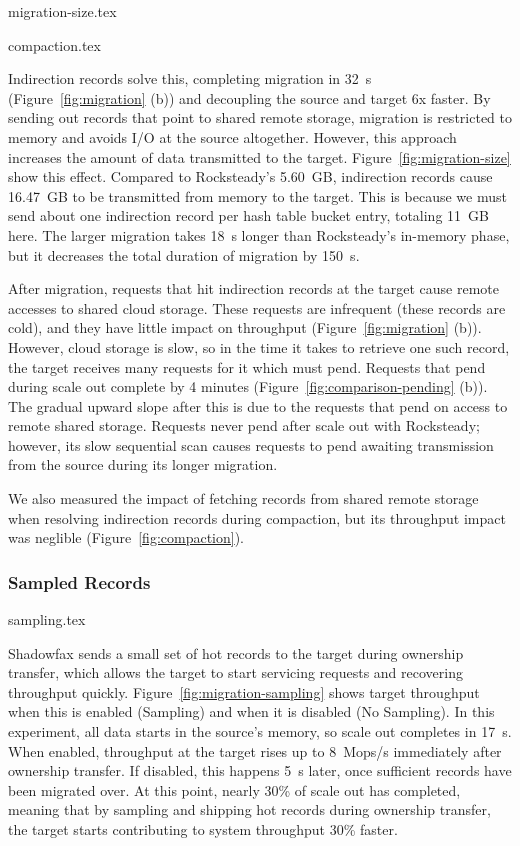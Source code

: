  {migration-size.tex}

 {compaction.tex}

Indirection records solve this, completing migration in 32~s
(Figure~\ref{fig:migration} (b)) and decoupling the source and target 6x faster.
%
By sending out records that point to shared remote storage, migration
is restricted to memory and avoids I/O at the source altogether.
%
%
However, this approach increases the amount of data transmitted to the target.
%
Figure~\ref{fig:migration-size} show this effect.
%
Compared to Rocksteady's 5.60~GB, indirection records cause
16.47~GB to be transmitted from memory to the target.
%
This is because we must send about one indirection record per hash table bucket
entry, totaling 11~GB here.
%
%
The larger migration takes 18~s longer than Rocksteady's in-memory phase, but it
decreases the total duration of migration by 150~s.

After migration, requests that hit indirection records at the
target cause remote accesses to shared cloud storage.
%
These requests are infrequent (these records are
cold), and they have little impact on throughput
(Figure~\ref{fig:migration} (b)).
%
However, cloud storage is slow, so in the time it takes to retrieve one such
record, the target receives many requests for it which must pend.
%
Requests that pend during scale out complete by 4 minutes
(Figure~\ref{fig:comparison-pending} (b)).
%
The gradual upward slope after this is due to the requests that
pend on access to remote shared storage.
%
Requests never pend after scale out with Rocksteady; however, its slow
sequential scan causes requests to pend awaiting transmission from the source
during its longer migration.

We also measured the impact of fetching records from shared remote storage when
resolving indirection records during compaction, but its throughput impact was
neglible (Figure~\ref{fig:compaction}).

\subsubsection{Sampled Records}
\label{sec:eval:sampling}

 {sampling.tex}

Shadowfax sends a small set of hot records to the target during ownership
transfer, which allows the target to start servicing requests and recovering
throughput quickly.
%
Figure~\ref{fig:migration-sampling} shows target throughput
when this is enabled (Sampling) and when it is disabled (No
Sampling).
%
In this experiment, all data starts in the source's memory, so scale out
completes in 17~s.
%
When enabled, throughput at the target rises up to 8~Mops/s immediately
after ownership transfer.
%
If disabled, this happens 5~s later, once sufficient records have
been migrated over.
%
At this point, nearly 30\% of scale out has completed, meaning that
by sampling and shipping hot records during ownership transfer,
the target starts contributing to system throughput 30\% faster.

